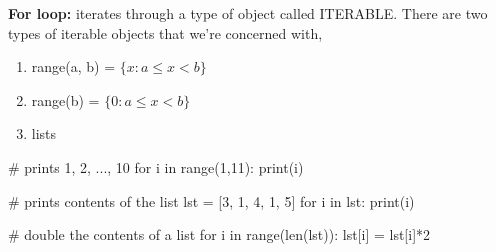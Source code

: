 \documentclass[12pt]{article}
\numberwithin{equation}{section}
\begin{document}
\textbf{For loop:} iterates through a type of object called ITERABLE. There are two types of iterable objects that we're concerned with,
\begin{enumerate}
    \item range(a, b) = $\{x : a\leq x <b\}$
    \item range(b) = $\{0 : a\leq x <b\}$
    \item lists
\end{enumerate}

\begin{python}
# prints 1, 2, ..., 10
for i in range(1,11):
    print(i)

# prints contents of the list
lst = [3, 1, 4, 1, 5]
for i in lst:
    print(i)
    
# double the contents of a list
for i in range(len(lst)):
    lst[i] = lst[i]*2 
\end{python}
\end{document}
